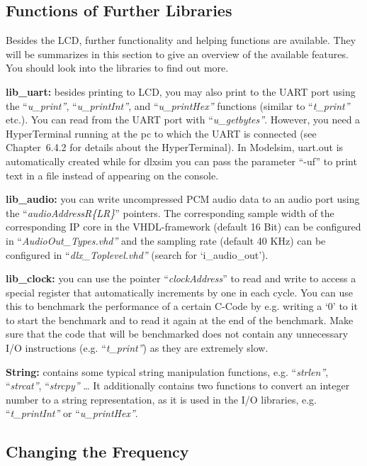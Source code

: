 \hypertarget{functions-of-further-libraries}{%
\subsection{Functions of Further
Libraries}\label{functions-of-further-libraries}}

Besides the LCD, further functionality and helping functions are
available. They will be summarizes in this section to give an overview
of the available features. You should look into the libraries to find
out more.

\textbf{lib\_uart:} besides printing to LCD, you may also print to the
UART port using the ``\emph{u\_print''}, ``\emph{u\_printInt''}, and
``\emph{u\_printHex''} functions (similar to ``\emph{t\_print''} etc.).
You can read from the UART port with ``\emph{u\_getbytes''}. However,
you need a HyperTerminal running at the pc to which the UART is
connected (see Chapter~6.4.2 for details about the HyperTerminal). In
Modelsim, uart.out is automatically created while for dlxsim you can
pass the parameter ``-uf'' to print text in a file instead of appearing
on the console.

\textbf{lib\_audio:} you can write uncompressed PCM audio data to an
audio port using the ``\emph{audioAddressR\{L\textbar R\}}'' pointers.
The corresponding sample width of the corresponding IP core in the
VHDL-framework (default 16 Bit) can be configured in
``\emph{AudioOut\_Types.vhd''} and the sampling rate (default 40 KHz)
can be configured in ``\emph{dlx\_Toplevel.vhd''} (search for
`i\_audio\_out').

\textbf{lib\_clock:} you can use the pointer ``\emph{clockAddress}'' to
read and write to access a special register that automatically
increments by one in each cycle. You can use this to benchmark the
performance of a certain C-Code by e.g. writing a `0' to it to start the
benchmark and to read it again at the end of the benchmark. Make sure
that the code that will be benchmarked does not contain any unnecessary
I/O instructions (e.g. ``\emph{t\_print''}) as they are extremely slow.

\textbf{String:} contains some typical string manipulation functions,
e.g. ``\emph{strlen''}, ``\emph{strcat''}, ``\emph{strcpy''} \ldots{} It
additionally contains two functions to convert an integer number to a
string representation, as it is used in the I/O libraries, e.g.
``\emph{t\_printInt''} or ``\emph{u\_printHex''}.

\hypertarget{changing-the-frequency}{%
\subsection{\texorpdfstring{Changing the Frequency
}{Changing the Frequency }}\label{changing-the-frequency}}

